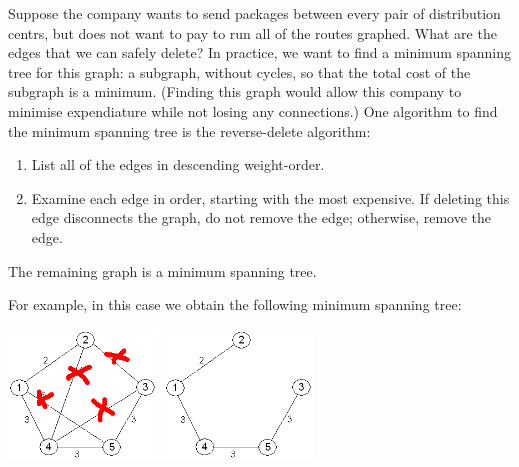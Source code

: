 Suppose the company wants to send packages between every pair of distribution centrs, but does not want to pay to run all of the
routes graphed. What are the edges that we can safely delete? In practice, we want to find a minimum spanning tree for this graph:
a subgraph, without cycles, so that the total cost of the subgraph is a minimum. (Finding this graph would allow this company to
minimise expendiature while not losing any connections.) One algorithm to find the minimum spanning tree is the reverse-delete algorithm:
\begin{alg}\leavevmode
  \begin{enumerate}
    \item List all of the edges in descending weight-order.
    \item Examine each edge in order, starting with the most expensive. If deleting this edge disconnects the graph, do not remove
          the edge; otherwise, remove the edge.
  \end{enumerate}
  The remaining graph is a minimum spanning tree.
\end{alg}
For example, in this case we obtain the following minimum spanning tree:
\begin{center}
  \includegraphics[width=0.3\textwidth]{graph2}
  \includegraphics[width=0.3\textwidth]{graph3}
\end{center}

